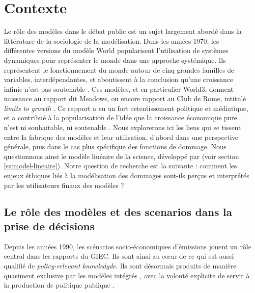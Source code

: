 


\section{Contexte}

Le rôle des modèles dans le débat public est un sujet largement abordé dans la littérature de la sociologie de la modélisation. Dans les années 1970, les différentes versions du modèle World popularisent l'utilisation de systèmes dynamiques pour représenter le monde dans une approche systémique. Ils représentent le fonctionnement du monde autour de cinq grandes familles de variables, interdépendantes, et aboutissent à la conclusion qu'une croissance infinie n'est pas soutenable \autocite{forrester_world_1971}.  Ces modèles, et en particulier World3, donnent naissance au rapport dit Meadows, ou encore rapport au Club de Rome, intitulé \emph{limits to growth} \autocite{meadows_limits_1972}. Ce rapport a eu un fort retentissement politique et médiatique, et a contribué à la popularisation de l'idée que la croissance économique pure n'est ni souhaitable, ni soutenable \autocite{edwards_global_1996}. 
Nous explorerons ici les liens qui se tissent entre la fabrique des modèles et leur utilisation, d'abord dans une perspective générale, puis dans le cas plus spécifique des fonctions de dommage. Nous questionnons ainsi le modèle linéaire de la science, développé par \textcite{aykut_gouverner_nodate} (voir section \ref{ss:model-lineaire}). Notre question de recherche est la suivante : comment les enjeux éthiques liés à la modélisation des dommages sont-ils perçus et interprétés par les utilisateurs finaux des modèles ? 

\subsection{Le rôle des modèles et des scenarios dans la prise de décisions}

Depuis les années 1990, les scénarios socio-économiques d'émissions jouent un rôle central dans les rapports du GIEC. Ils sont ainsi au cœur de ce qui est aussi qualifié de \emph{policy-relevant knowledgde}. Ils sont désormais produits de manière quasiment exclusive par les modèles intégrés \autocite{cointe_organising_2019}, avec la volonté explicite de servir à la production de politique publique \autocite{weyant_integrated_1995}. \\



